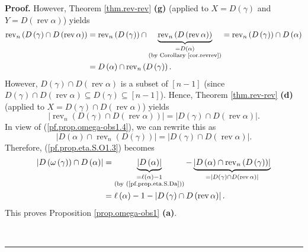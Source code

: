 \documentclass[numbers=enddot,12pt,final,onecolumn,notitlepage]{scrartcl}%
\theoremstyle{definition}
\newenvironment{proof}[1][Proof]{\noindent\textbf{#1.} }{\ \rule{0.5em}{0.5em}}
\begin{document}
\begin{proof}
However, Theorem \ref{thm.rev-rev} \textbf{(g)} (applied to $X=D\left(
\gamma\right)  $ and $Y=D\left(  \operatorname*{rev}\alpha\right)  $) yields%
\begin{align}
\operatorname*{rev}\nolimits_{n}\left(  D\left(  \gamma\right)  \cap D\left(
\operatorname*{rev}\alpha\right)  \right)   &  =\operatorname*{rev}%
\nolimits_{n}\left(  D\left(  \gamma\right)  \right)  \cap
\underbrace{\operatorname*{rev}\nolimits_{n}\left(  D\left(
\operatorname*{rev}\alpha\right)  \right)  }_{\substack{=D\left(
\alpha\right)  \\\text{(by Corollary \ref{cor.revrev})}}}=\operatorname*{rev}%
\nolimits_{n}\left(  D\left(  \gamma\right)  \right)  \cap D\left(
\alpha\right) \nonumber\\
&  =D\left(  \alpha\right)  \cap\operatorname*{rev}\nolimits_{n}\left(
D\left(  \gamma\right)  \right)  . \label{pf.prop.omega-obs1.4}%
\end{align}
However, $D\left(  \gamma\right)  \cap D\left(  \operatorname*{rev}%
\alpha\right)  $ is a subset of $\left[  n-1\right]  $ (since $D\left(
\gamma\right)  \cap D\left(  \operatorname*{rev}\alpha\right)  \subseteq
D\left(  \gamma\right)  \subseteq\left[  n-1\right]  $). Hence, Theorem
\ref{thm.rev-rev} \textbf{(d)} (applied to $X=D\left(  \gamma\right)  \cap
D\left(  \operatorname*{rev}\alpha\right)  $) yields%
\[
\left\vert \operatorname*{rev}\nolimits_{n}\left(  D\left(  \gamma\right)
\cap D\left(  \operatorname*{rev}\alpha\right)  \right)  \right\vert
=\left\vert D\left(  \gamma\right)  \cap D\left(  \operatorname*{rev}%
\alpha\right)  \right\vert .
\]
In view of (\ref{pf.prop.omega-obs1.4}), we can rewrite this as%
\[
\left\vert D\left(  \alpha\right)  \cap\operatorname*{rev}\nolimits_{n}\left(
D\left(  \gamma\right)  \right)  \right\vert =\left\vert D\left(
\gamma\right)  \cap D\left(  \operatorname*{rev}\alpha\right)  \right\vert .
\]
Therefore, (\ref{pf.prop.eta.S.O1.3}) becomes%
\begin{align*}
\left\vert D\left(  \omega\left(  \gamma\right)  \right)  \cap D\left(
\alpha\right)  \right\vert  &  =\underbrace{\left\vert D\left(  \alpha\right)
\right\vert }_{\substack{=\ell\left(  \alpha\right)  -1\\\text{(by
(\ref{pf.prop.eta.S.Da}))}}}-\underbrace{\left\vert D\left(  \alpha\right)
\cap\operatorname*{rev}\nolimits_{n}\left(  D\left(  \gamma\right)  \right)
\right\vert }_{=\left\vert D\left(  \gamma\right)  \cap D\left(
\operatorname*{rev}\alpha\right)  \right\vert }\\
&  =\ell\left(  \alpha\right)  -1-\left\vert D\left(  \gamma\right)  \cap
D\left(  \operatorname*{rev}\alpha\right)  \right\vert .
\end{align*}
This proves Proposition \ref{prop.omega-obs1} \textbf{(a)}. \medskip


\end{proof}
\end{document}
